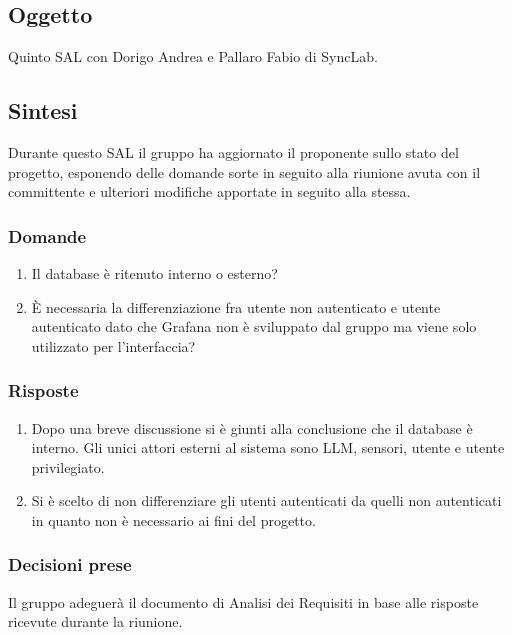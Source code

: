 \documentclass[10pt]{article}
\begin{document}
\subsection{Oggetto}
Quinto SAL con Dorigo Andrea e Pallaro Fabio di SyncLab.

\subsection{Sintesi}
Durante questo SAL il gruppo ha aggiornato il proponente sullo stato del progetto, esponendo delle domande sorte in seguito alla riunione avuta con il committente e ulteriori modifiche apportate in seguito alla stessa.

\subsubsection{Domande}
\begin{enumerate}
  \item Il database è ritenuto interno o esterno?
  \item È necessaria la differenziazione fra utente non autenticato e utente autenticato dato che Grafana non è sviluppato dal gruppo ma viene solo utilizzato per l'interfaccia?
\end{enumerate}

\subsubsection{Risposte}
\begin{enumerate}
  \item Dopo una breve discussione si è giunti alla conclusione che il database è interno. Gli unici attori esterni al sistema sono LLM, sensori, utente e utente privilegiato.
  \item Si è scelto di non differenziare gli utenti autenticati da quelli non autenticati in quanto non è necessario ai fini del progetto.
\end{enumerate}

\subsubsection{Decisioni prese}
Il gruppo adeguerà il documento di Analisi dei Requisiti in base alle risposte ricevute durante la riunione.

\pagebreak
\end{document}

